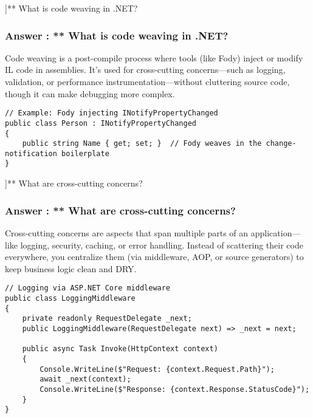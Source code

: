 \QuestionSlide[\CategoryBadge[MetaColor!20]{Metaprogramming}]{** What is code weaving in .NET?}
\begin{frame}[fragile]
  \frametitle{Answer \theqcounter: ** What is code weaving in .NET?}


  {\footnotesize
    Code weaving is a post-compile process where tools (like Fody) inject or modify IL code in assemblies. It’s used for cross-cutting concerns—such as logging, validation, or performance instrumentation—without cluttering source code, though it can make debugging more complex.
  }

  \begin{verbatim}
// Example: Fody injecting INotifyPropertyChanged
public class Person : INotifyPropertyChanged
{
    public string Name { get; set; }  // Fody weaves in the change-notification boilerplate
}
  \end{verbatim}
\end{frame}

\QuestionSlide[\CategoryBadge[ArchColor!20]{Architecture}]{** What are cross-cutting concerns?}
\begin{frame}[fragile]
  \frametitle{Answer \theqcounter: ** What are cross-cutting concerns?}


  {\footnotesize
    Cross-cutting concerns are aspects that span multiple parts of an application—like logging, security, caching, or error handling. Instead of scattering their code everywhere, you centralize them (via middleware, AOP, or source generators) to keep business logic clean and DRY.
  }

  \begin{verbatim}
// Logging via ASP.NET Core middleware
public class LoggingMiddleware
{
    private readonly RequestDelegate _next;
    public LoggingMiddleware(RequestDelegate next) => _next = next;

    public async Task Invoke(HttpContext context)
    {
        Console.WriteLine($"Request: {context.Request.Path}");
        await _next(context);
        Console.WriteLine($"Response: {context.Response.StatusCode}");
    }
}
  \end{verbatim}
\end{frame}

